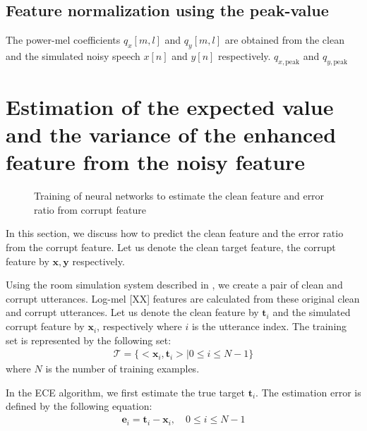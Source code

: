 \documentclass{article}
\begin{document}
\subsection{Feature normalization using the peak-value}


The power-mel coefficients $q_x[m, l]$ and $q_y[m, l]$
are obtained from the clean and the simulated noisy
speech $x[n]$ and $y[n]$ respectively. $q_{x, \text{peak}}$
and $q_{y, \text{peak}}$







\section{Estimation of the expected value and the variance
  of the enhanced feature from the noisy feature}
\label{sec:estimation}

\begin{figure}
    \centering
    \resizebox{80mm}{!}{%
         } %
    \caption {
      Training of neural networks to estimate the clean feature and error ratio from corrupt feature
      \label{MFCCPNCCComparison}
    }
\end{figure}







In this section, we discuss how to predict the clean feature and the
error ratio from the corrupt feature. Let us denote the clean target feature,
the corrupt feature by $\boldsymbol{x}, \boldsymbol{y}$ respectively.

Using the room simulation system described in \cite{C_Kim_INTERSPEECH_2017_1},
we create a pair of clean and
corrupt utterances. Log-mel [XX] features are calculated from these original clean
and corrupt utterances. Let us denote the clean feature by $\boldsymbol{t}_i$ and
the simulated corrupt feature by $\boldsymbol{x}_i$, respectively where $i$ is the
utterance index. The training set is represented by the following set:
\begin{align}
  \mathcal{T} = \{<\boldsymbol{x}_i, \boldsymbol{t}_i>| 0 \le i \le N - 1\}
\end{align}
where $N$ is the number of training examples.

In the ECE algorithm, we first estimate the true target $\boldsymbol{t}_i$. The
estimation error is defined by the following equation:
\begin{align}
  \boldsymbol{e}_i =  \boldsymbol{t}_i - \boldsymbol{x}_i, \quad 0 \le i \le N - 1
\end{align}
\end{document}
